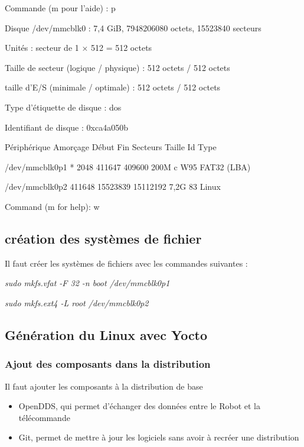 {\begin{minipage}{0.9\textwidth}
Commande (m pour l'aide) : p

Disque /dev/mmcblk0 : 7,4 GiB, 7948206080 octets, 15523840 secteurs

Unités : secteur de 1 × 512 = 512 octets

Taille de secteur (logique / physique) : 512 octets / 512 octets

taille d'E/S (minimale / optimale) : 512 octets / 512 octets

Type d'étiquette de disque : dos

Identifiant de disque : 0xca4a050b



Périphérique Amorçage Début Fin Secteurs Taille Id Type

/dev/mmcblk0p1 * 2048 411647 409600 200M c W95 FAT32 (LBA)

/dev/mmcblk0p2 411648 15523839 15112192 7,2G 83 Linux





Command (m for help): w

\end{minipage}}

\subsection{création des systèmes de fichier}

Il faut créer les systèmes de fichiers avec les commandes suivantes : 


\textit{sudo mkfs.vfat -F 32 -n boot /dev/mmcblk0p1}

\textit{sudo mkfs.ext4 -L root /dev/mmcblk0p2}



\subsection{Génération du Linux avec Yocto}


\subsubsection{Ajout des composants dans la distribution}

Il faut ajouter les composants à la distribution de base
\begin{itemize}

\item OpenDDS, qui permet d'échanger des données entre le Robot et la télécommande

\item Git, permet de mettre à jour les logiciels sans avoir à recréer une distribution

\end{itemize}

